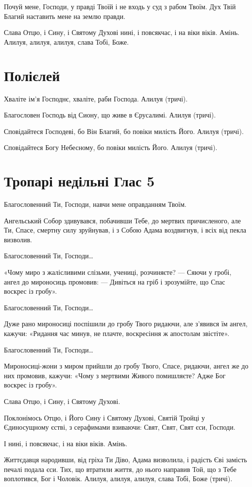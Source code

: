 \documentclass[chapters.tex]{subfiles}
\begin{document}
Почуй мене, Господи, у правді Твоїй і не входь у суд з рабом Твоїм. Дух Твій Благий наставить мене на землю правди.

Слава Отцю, і Сину, і Святому Духові нині, і повсякчас, і на віки віків. Амінь. Алилуя, алилуя, алилуя, слава Тобі, Боже.

\section{Полієлей}
Хваліте ім’я Господнє, хваліте, раби Господа. Алилуя (тричі).

Благословен Господь від Сиону, що живе в Єрусалимі. Алилуя (тричі).

Сповідайтеся Господеві, бо Він Благий, бо повіки милість Його. Алилуя (тричі).

Сповідайтеся Богу Небесному, бо повіки милість Його. Алилуя (тричі).

\section{Тропарі недільні Глас 5}
Благословенний Ти, Господи, навчи мене оправданням Твоїм.

Ангельський Собор здивувався, побачивши Тебе, до мертвих причисленого, але Ти, Спасе, смертну силу зруйнував, і з Собою Адама воздвигнув, і всіх від пекла визволив.

Благословенний Ти, Господи…

«Чому миро з жалісливими слізьми, учениці, розчиняєте? — Сяючи у гробі, ангел до мироносиць промовив: — Дивіться на гріб і зрозумійте, що Спас воскрес із гробу».

Благословенний Ти, Господи…

Дуже рано мироносиці поспішили до гробу Твого ридаючи, але з’явився їм ангел, кажучи: «Ридання час минув, не плачте, воскресіння ж апостолам звістіте».

Благословенний Ти, Господи…

Мироносиці-жони з миром прийшли до гробу Твого, Спасе, ридаючи, ангел же до них промовив, кажучи: «Чому з мертвими Живого помишляєте? Адже Бог воскрес із гробу».

Слава Отцю, і Сину, і Святому Духові.

Поклонімось Отцю, і Його Сину і Святому Духові, Святій Тройці у Єдиносущному єстві, з серафимами взиваючи: Свят, Свят, Свят єси, Господи.

І нині, і повсякчас, і на віки віків. Амінь.

Життєдавця народивши, від гріха Ти Діво, Адама визволила, і радість Єві замість печалі подала єси. Тих, що втратили життя, до нього направив Той, що з Тебе воплотився, Бог і Чоловік. Алилуя, алилуя, алилуя, слава Тобі, Боже (тричі).
\end{document}
